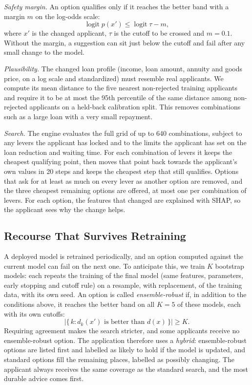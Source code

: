 \emph{Safety margin.} An option qualifies only if it reaches the better band with a margin $m$ on the log-odds scale:
\begin{equation}
\operatorname{logit} p(x') \leq \operatorname{logit} \tau - m,
\label{eq:margin}
\end{equation}
where $x'$ is the changed applicant, $\tau$ is the cutoff to be crossed and $m = 0.1$. Without the margin, a
suggestion can sit just below the cutoff and fail after any small change to the model.

\emph{Plausibility.} The changed loan profile (income, loan amount, annuity and goods price, on a log scale and
standardized) must resemble real applicants. We compute its mean distance to the five nearest non-rejected training
applicants and require it to be at most the 95th percentile of the same distance among non-rejected applicants on a
held-back calibration split. This removes combinations such as a large loan with a very small repayment.

\emph{Search.} The engine evaluates the full grid of up to 640 combinations, subject to any levers the applicant has
locked and to the limits the applicant has set on the loan reduction and waiting time. For each combination of levers
it keeps the cheapest qualifying point, then moves that point back towards the applicant's own values in 20 steps and
keeps the cheapest step that still qualifies. Options that ask for at least as much on every lever as another option
are removed, and the three cheapest remaining options are offered, at most one per combination of levers. For each
option, the features that changed are explained with SHAP, so the applicant sees why the change helps.

\subsection{Recourse That Survives Retraining}
\label{sec:robust}
A deployed model is retrained periodically, and an option computed against the current model can fail on the next
one. To anticipate this, we train $K$ bootstrap models: each repeats the training of the final model (same features,
parameters, early stopping and cutoff rule) on a resample, with replacement, of the training data, with its own seed.
An option is called \emph{ensemble-robust} if, in addition to the conditions above, it reaches the better band on all
$K = 5$ of these models, each with its own cutoffs:
\begin{equation}
\left|\{\,k : d_k(x') \text{ is better than } d(x)\,\}\right| \geq K.
\label{eq:agree}
\end{equation}
Requiring agreement makes the search stricter, and some applicants receive no ensemble-robust option. The application
therefore uses a \emph{hybrid}: ensemble-robust options are listed first and labelled as likely to hold if the model is
updated, and standard options fill the remaining places, labelled as possibly changing. The applicant always receives
the same coverage as the standard search, and the most durable advice comes first.

